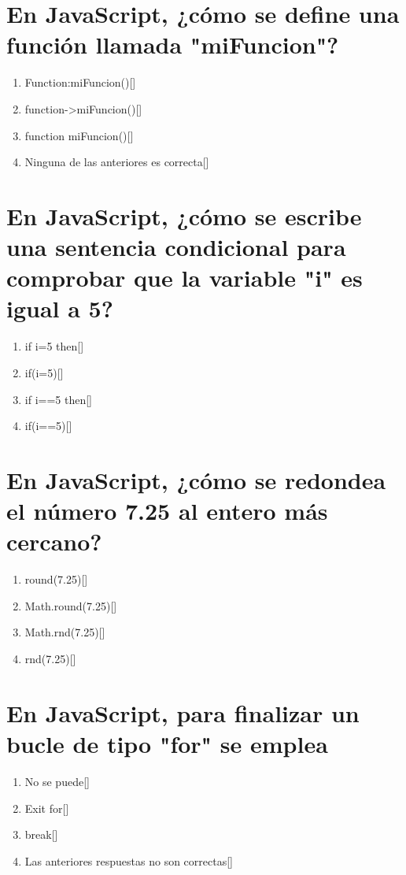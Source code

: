 \documentclass[addpoints, 12]{exam}{article}
\begin{document}
\section{En JavaScript, ¿cómo se define una función llamada "miFuncion"?}
\label{sec:orgf6a4a4b}
\begin{enumerate}
\item Function:miFuncion()[]
\item function->miFuncion()[]
\item function miFuncion()[]
\item Ninguna de las anteriores es correcta[]
\end{enumerate}

\section{En JavaScript, ¿cómo se escribe una sentencia condicional para comprobar que la variable "i" es igual a 5?}
\label{sec:org685126b}
\begin{enumerate}
\item if i=5 then[]
\item if(i=5)[]
\item if i==5 then[]
\item if(i==5)[]
\end{enumerate}

\section{En JavaScript, ¿cómo se redondea el número 7.25 al entero más cercano?}
\label{sec:org3c15e45}
\begin{enumerate}
\item round(7.25)[]
\item Math.round(7.25)[]
\item Math.rnd(7.25)[]
\item rnd(7.25)[]
\end{enumerate}

\section{En JavaScript, para finalizar un bucle de tipo "for" se emplea}
\label{sec:org8827e60}
\begin{enumerate}
\item No se puede[]
\item Exit for[]
\item break[]
\item Las anteriores respuestas no son correctas[]
\end{enumerate}
\end{document}
